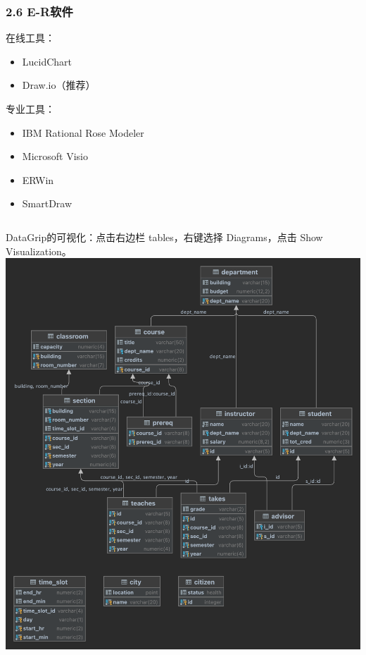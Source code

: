 \documentclass[aspectratio=169, 14pt]{beamer}
\begin{document}
\begin{frame}
    \frametitle{2.6 E-R软件}
在线工具：

\begin{itemize}
    \item LucidChart
    \item Draw.io（推荐）
\end{itemize}
    
专业工具：

\begin{itemize}
    \item IBM Rational Rose Modeler
    \item Microsoft Visio
    \item ERWin
    \item SmartDraw    
\end{itemize}

\end{frame}

\begin{frame}

\begin{columns}
    DataGrip的可视化：点击右边栏 tables，右键选择 Diagrams，点击 Show Visualization。
    \includegraphics[width=.9\textwidth]{week10/uml}
\end{columns}

\end{frame}
\end{document}
